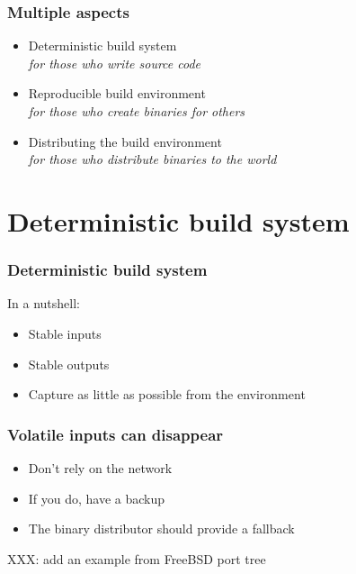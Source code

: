 \documentclass[14pt,ignorenonframetext]{beamer}
\begin{document}
\begin{frame}
\frametitle{Multiple aspects}

\begin{itemize}
\item Deterministic build system \\
  \textit{\small for those who write source code}
\item Reproducible build environment \\
  \textit{\small for those who create binaries for others}
\item Distributing the build environment \\
  \textit{\small for those who distribute binaries to the world}
\end{itemize}

\end{frame}

\section{Deterministic build system}

\begin{frame}
\frametitle{Deterministic build system}

In a nutshell:

\begin{itemize}
\item Stable inputs
\item Stable outputs
\item Capture as little as possible from the environment
\end{itemize}

\end{frame}

\begin{frame}
\frametitle{Volatile inputs can disappear}

\begin{itemize}
\item Don't rely on the network
\item If you do, have a backup
\item The binary distributor should provide a fallback
\end{itemize}

XXX: add an example from FreeBSD port tree

\end{frame}
\end{document}
